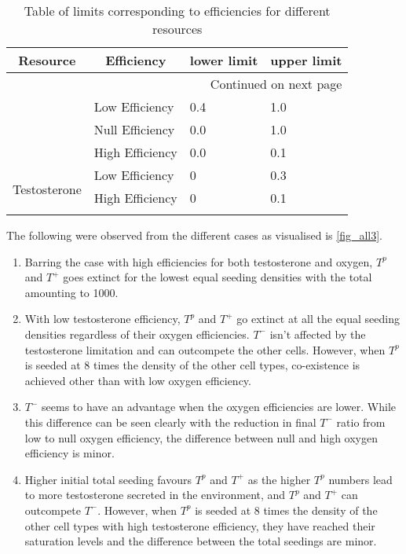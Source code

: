 \begin{longtable}[c]{|l|l|l|l|}
  \hline  \multicolumn{1}{|c|}{\textbf{Resource}} & \multicolumn{1}{c|}{\textbf{Efficiency}} & \multicolumn{1}{c|}{\textbf{lower limit}} & \multicolumn{1}{c|}{\textbf{upper limit}}  \\ \hline
  \endhead

  \hline \multicolumn{4}{|r|}{{Continued on next page}} \\ \hline
  \endfoot

  \endlastfoot

  \multirow{3}{*}{Oxygen} & Low Efficiency & 0.4 & 1.0 \\ \cline{2-4}
  & Null Efficiency & 0.0 & 1.0 \\ \cline{2-4}
  & High Efficiency & 0.0 & 0.1 \\ \hline
  \multirow{3}{*}{Testosterone} & Low Efficiency & 0 & 0.3 \\ \cline{2-4}
  & High Efficiency & 0 & 0.1 \\ \hline

  \caption{Table of limits corresponding to efficiencies for different resources}
  \label{tab_efficiencies}
\end{longtable}

The following were observed from the different cases as visualised is \autoref{fig_all3}.
\begin{enumerate}
  \item Barring the case with high efficiencies for both testosterone and oxygen, $T^p$ and $T^+$ goes extinct for the lowest equal seeding densities with the total amounting to 1000.
  \item With low testosterone efficiency, $T^p$ and $T^+$ go extinct at all the equal seeding densities regardless of their oxygen efficiencies. $T^-$ isn't affected by the testosterone limitation and can outcompete the other cells. However, when $T^p$ is seeded at 8 times the density of the other cell types, co-existence is achieved  other than with low oxygen efficiency.
  \item $T^-$ seems to have an advantage when the oxygen efficiencies are lower. While this difference can be seen clearly with the reduction in final $T^-$ ratio from low to null oxygen efficiency, the difference between null and high oxygen efficiency is minor.
  \item Higher initial total seeding favours $T^p$ and $T^+$ as the higher $T^p$ numbers lead to more testosterone secreted in the environment, and $T^p$ and $T^+$ can outcompete $T^-$. However, when $T^p$ is seeded at 8 times the density of the other cell types with high testosterone efficiency, they have reached their saturation levels and the difference between the total seedings are minor.
\end{enumerate}

